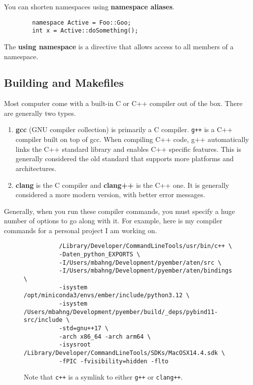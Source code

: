 \documentclass{article}
\begin{document}
    \begin{lemma}
      You can shorten namespaces using \textbf{namespace aliases}. 
      \begin{lstlisting}
        namespace Active = Foo::Goo; 
        int x = Active::doSomething(); 
      \end{lstlisting}
    \end{lemma}

    \begin{lemma}
      The \textbf{using namespace} is a directive that allows access to all members of a namespace. 
    \end{lemma}

  \subsection{Building and Makefiles}
    
      Most computer come with a built-in C or C++ compiler out of the box. There are generally two types. 
      \begin{enumerate}
        \item \textbf{gcc} (GNU compiler collection) is primarily a C compiler. \texttt{g++} is a C++ compiler built on top of gcc. When compiling C++ code, g++ automatically links the C++ standard library and enables C++ specific features. This is generally considered the old standard that supports more platforms and architectures.  
        \item \textbf{clang} is the C compiler and \textbf{clang++} is the C++ one. It is generally considered a more modern version, with better error messages. 
      \end{enumerate} 

      Generally, when you run these compiler commands, you must specify a huge number of options to go along with it. For example, here is my compiler commands for a personal project I am working on. 

      \begin{figure}[H]
        \centering 
        \begin{lstlisting}
          /Library/Developer/CommandLineTools/usr/bin/c++ \
          -Daten_python_EXPORTS \
          -I/Users/mbahng/Development/pyember/aten/src \
          -I/Users/mbahng/Development/pyember/aten/bindings \
          -isystem /opt/miniconda3/envs/ember/include/python3.12 \
          -isystem /Users/mbahng/Development/pyember/build/_deps/pybind11-src/include \
          -std=gnu++17 \
          -arch x86_64 -arch arm64 \
          -isysroot /Library/Developer/CommandLineTools/SDKs/MacOSX14.4.sdk \
          -fPIC -fvisibility=hidden -flto 
        \end{lstlisting}
        \caption{Note that \texttt{c++} is a symlink to either \texttt{g++} or \texttt{clang++}.} 
        \label{fig:com_code}
      \end{figure} 
\end{document}

